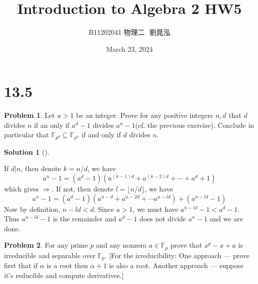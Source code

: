 \documentclass{article}
\title{Introduction to Algebra 2 HW5}
\author{B11202041 物理二 $ $ 劉晁泓}
\date{March 23, 2024}
\newcommand{\floor}[1]{\lfloor #1 \rfloor}
\theoremstyle{definition}
\newtheorem{prob}{Problem}
\newtheorem*{sol}{Solution}
\newenvironment{sols}[1][]{%
  \begin{sol}[#1]$ $\par\nobreak\ignorespaces
}{%
  \end{sol}
}
\begin{document}
\maketitle
\thispagestyle{fancy}
\renewcommand{\footrulewidth}{0.4pt}
\cfoot{\thepage}
\renewcommand{\headrulewidth}{0.4pt}

\section*{13.5}

\setcounter{prob}{3}
\begin{prob}
	Let $a > 1$ be an integer.
	Prove for any positive integers $n, d$ that $d$ divides $n$ if an only if $a^d - 1$ divides $a^n - 1$(cf. the previous exercise).
	Conclude in particular that $\mathbb{F}_{p^d} \subseteq \mathbb{F}_{p^n}$ if and only if $d$ divides $n$.
\end{prob}

\begin{sols}
	If $d|n$, then denote $k = n/d$, we have
	\[
		a^n - 1 = (a^d - 1) (a^{(k - 1)d} + a^{(k - 2) d} + \cdots + a^d + 1)
	\]
	which gives $\Rightarrow$.
	If not, then denote $l = \floor{n/d}$, we have
	\[
		a^n - 1 = (a^d - 1) (a^{n - d} + a^{n - 2d} + \cdots a^{n - ld}) + (a^{n - ld} - 1)
	\]
	Now by definition, $n - ld < d$.
	Since $a > 1$, we must have $a^{n - ld} - 1 < a^{d} - 1$.
	Thus $a^{n - ld} - 1$ is the remainder and $a^d - 1$ does not divide $a^n - 1$ and we are done.
\end{sols}

\begin{prob}
	For any prime $p$ and any nonzero $a \in \mathbb{F}_p$ prove that $x^p - x + a$ is irreducible and separable over $\mathbb{F}_p$. 
	[For the irreducibility: One approach --- prove first that if $\alpha$ is a root then $\alpha + 1$ is also a root.
	Another approach --- suppose it's reducible and compute derivatives.]
\end{prob}
\end{document}
